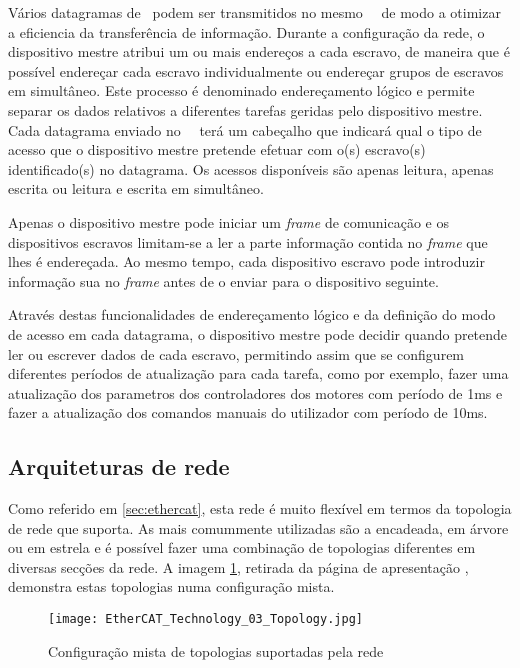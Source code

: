 Vários datagramas de \ecat\ podem ser transmitidos no mesmo \framee\ \ethernet\
de modo a otimizar a eficiencia da transferência de informação. Durante
a configuração da rede, o dispositivo mestre atribui um ou mais endereços 
a cada escravo, de maneira que é possível endereçar cada escravo individualmente
ou endereçar grupos de escravos em simultâneo. Este processo é denominado
endereçamento lógico e permite separar os dados relativos a diferentes
tarefas geridas pelo dispositivo mestre. Cada datagrama enviado no
\framee\ \ethernet\ terá um cabeçalho que indicará qual o tipo de acesso
que o dispositivo mestre pretende efetuar com o(s) escravo(s) identificado(s)
no datagrama. Os acessos disponíveis são apenas leitura, apenas escrita
ou leitura e escrita em simultâneo.

Apenas o dispositivo mestre pode iniciar um \emph{frame} de comunicação
e os dispositivos escravos limitam-se a ler a parte informação contida
no \emph{frame} que lhes é endereçada. Ao mesmo tempo, cada dispositivo
escravo pode introduzir informação sua  no \emph{frame} antes de o enviar
para o dispositivo seguinte.

Através destas funcionalidades de endereçamento lógico e da definição do
modo de acesso em cada datagrama, o dispositivo mestre pode decidir quando
pretende ler ou escrever dados de cada escravo, permitindo assim que se
configurem diferentes períodos de atualização para cada tarefa, como por
exemplo, fazer uma atualização dos parametros dos controladores dos motores
com período de 1ms e fazer a atualização dos comandos manuais do utilizador
com período de 10ms.

\subsection{Arquiteturas de rede}
\label{sec:daisychain}
Como referido em \ref{sec:ethercat}, esta rede é muito flexível em termos
da topologia de rede que suporta. As mais comummente utilizadas são
a encadeada, em árvore ou em estrela e é possível fazer uma combinação de
topologias diferentes em diversas secções da rede. A imagem 
\ref{fig:ecat-topology}, retirada da página de apresentação
\cite[]{group:EtherCAT}, demonstra estas topologias numa configuração mista.

\begin{figure}[htp]
 \centering
 \texttt{[image: EtherCAT\_Technology\_03\_Topology.jpg]}
 \caption{Configuração mista de topologias suportadas pela rede \ecat}
 \label{fig:ecat-topology}
\end{figure}


